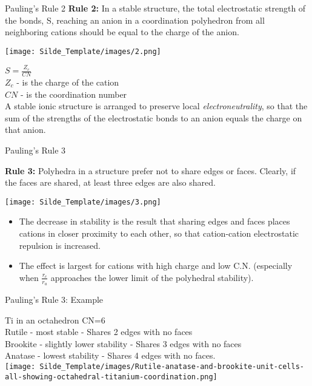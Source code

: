 \documentclass{libs/XJTLU_format}
\begin{document}
\begin{frame}{Pauling's Rule 2}
    \textbf{Rule 2:} In a stable structure, the total electrostatic strength of the bonds, S, reaching an anion in a coordination polyhedron from all neighboring cations should be equal to the charge of the anion.\\[1em]
    \pause
    
    \centering
    \texttt{[image: Silde\_Template/images/2.png]}
    
    \pause
    \centering
    $S = \frac{Z_c}{CN}$
    \\[1em]
    
    \justifying
    $Z_c$ - is the charge of the cation\\
    $CN$ - is the coordination number\\[1em]
    \pause
    A stable ionic structure is arranged to preserve local \emph{electroneutrality}, so that the sum of the strengths of the electrostatic bonds to an anion equals the charge on that anion.
    
\end{frame}

\begin{frame}{Pauling's Rule 3}

    \textbf{Rule 3:} Polyhedra in a structure prefer not to share edges or faces. Clearly, if the faces are shared, at least three edges are also shared. \pause
    
    \centering
    \texttt{[image: Silde\_Template/images/3.png]}
    
    \begin{itemize}
        \item The decrease in stability is the result that sharing edges and faces places cations in closer proximity to each other, so that cation-cation electrostatic repulsion is increased.  \pause
        \item The effect is largest for cations with high charge and low C.N. (especially when $\frac{r_c}{r_a}$ approaches the lower limit of the polyhedral stability).
    \end{itemize}
\end{frame}

\begin{frame}{Pauling's Rule 3:  Example }
    
    Ti in an octahedron CN=6\\[12 pt]
    Rutile - most stable - Shares 2 edges with no faces\\
    Brookite - slightly lower stability - Shares 3 edges with no faces\\
    Anatase - lowest stability - Shares 4 edges with no faces.\\[2em]
    \centering
    \texttt{[image: Silde\_Template/images/Rutile-anatase-and-brookite-unit-cells-all-showing-octahedral-titanium-coordination.png]}
\end{frame}
\end{document}
